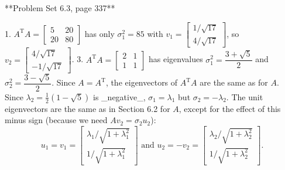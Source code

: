 

**Problem Set 6.3, page 337**

1. \(A^{\mathrm{T}}A=\begin{bmatrix}5&20\\ 20&80\end{bmatrix}\) has only \(\sigma_{1}^{2}=85\) with \(v_{1}=\begin{bmatrix}1/\sqrt{17}\\ 4/\sqrt{17}\end{bmatrix}\), so \(v_{2}=\begin{bmatrix}4/\sqrt{17}\\ -1/\sqrt{17}\end{bmatrix}\).
3. \(A^{\mathrm{T}}A=\begin{bmatrix}2&1\\ 1&1\end{bmatrix}\) has eigenvalues \(\sigma_{1}^{2}=\dfrac{3+\sqrt{5}}{2}\) and \(\sigma_{2}^{2}=\dfrac{3-\sqrt{5}}{2}\). Since \(A=A^{\mathrm{T}}\), the eigenvectors of \(A^{\mathrm{T}}A\) are the same as for \(A\). Since \(\lambda_{2}=\frac{1}{2}(1-\sqrt{5})\) is _negative_, \(\sigma_{1}=\lambda_{1}\) but \(\sigma_{2}=-\lambda_{2}\). The unit eigenvectors are the same as in Section 6.2 for \(A\), except for the effect of this minus sign (because we need \(Av_{2}=\sigma_{2}u_{2}\)): \[u_{1}=v_{1}=\begin{bmatrix}\lambda_{1}/\sqrt{1+\lambda_{1}^{2}}\\ 1/\sqrt{1+\lambda_{1}^{2}}\end{bmatrix}\text{ and }u_{2}=-v_{2}=\begin{bmatrix} \lambda_{2}/\sqrt{1+\lambda_{2}^{2}}\\ 1/\sqrt{1+\lambda_{2}^{2}}\end{bmatrix}.\]
